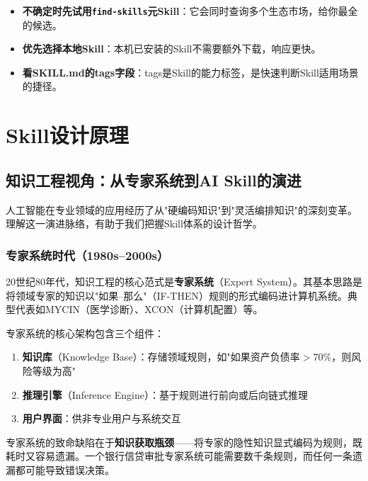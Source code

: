 \begin{notebox}[Skill发现的三条经验]
\begin{itemize}[leftmargin=1em]
  \item \textbf{不确定时先试用\texttt{find-skills}元Skill}：它会同时查询多个生态市场，给你最全的候选。
  \item \textbf{优先选择本地Skill}：本机已安装的Skill不需要额外下载，响应更快。
  \item \textbf{看SKILL.md的tags字段}：tags是Skill的能力标签，是快速判断Skill适用场景的捷径。
\end{itemize}
\end{notebox}

\section{Skill设计原理}

\subsection{知识工程视角：从专家系统到AI Skill的演进}

人工智能在专业领域的应用经历了从"硬编码知识"到"灵活编排知识"的深刻变革。理解这一演进脉络，有助于我们把握Skill体系的设计哲学。

\subsubsection{专家系统时代（1980s--2000s）}

20世纪80年代，知识工程的核心范式是\textbf{专家系统}（Expert System）。其基本思路是将领域专家的知识以"如果--那么"（IF-THEN）规则的形式编码进计算机系统。典型代表如MYCIN（医学诊断）、XCON（计算机配置）等。

专家系统的核心架构包含三个组件：
\begin{enumerate}[leftmargin=2em]
  \item \textbf{知识库}（Knowledge Base）：存储领域规则，如"如果资产负债率$>$70\%，则风险等级为高"
  \item \textbf{推理引擎}（Inference Engine）：基于规则进行前向或后向链式推理
  \item \textbf{用户界面}：供非专业用户与系统交互
\end{enumerate}

专家系统的致命缺陷在于\textbf{知识获取瓶颈}——将专家的隐性知识显式编码为规则，既耗时又容易遗漏。一个银行信贷审批专家系统可能需要数千条规则，而任何一条遗漏都可能导致错误决策。

